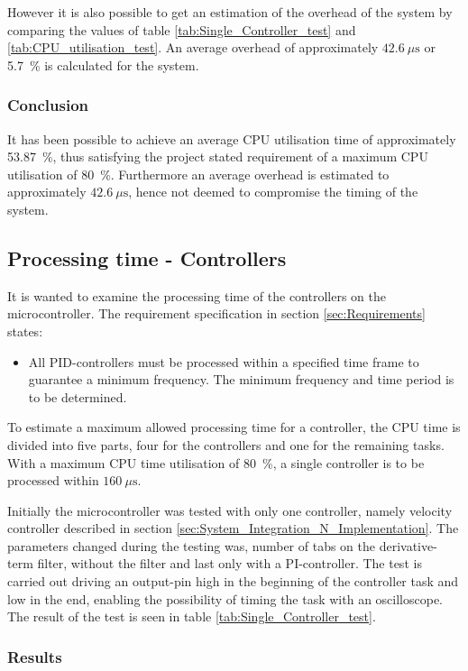 \documentclass[../../main.tex]{subfiles}
\begin{document}
However it is also possible to get an estimation of the overhead of the system by comparing the values of table \ref{tab:Single_Controller_test} and \ref{tab:CPU_utilisation_test}. An average overhead of approximately $\SI{42,6}{\mu\second}$ or \SI{5,7}{\percent} is calculated for the system.

\subsubsection*{Conclusion}
It has been possible to achieve an average CPU utilisation time of approximately \SI{ 53,87}{\percent}, thus satisfying the project stated requirement of a maximum CPU utilisation of \SI{80}{\percent}. Furthermore an average overhead is estimated to approximately $\SI{42,6}{\mu\second}$, hence not deemed to compromise the timing of the system.

\subsection{Processing time - Controllers}
It is wanted to examine the processing time of the controllers on the microcontroller. The requirement specification in section \ref{sec:Requirements} states:
\begin{itemize}
    \item All PID-controllers must be processed within a specified time frame to guarantee a minimum frequency. The minimum frequency and time period is to be determined.
\end{itemize}
To estimate a maximum allowed processing time for a controller, the CPU time is divided into five parts, four for the controllers and one for the remaining tasks. With a maximum CPU time utilisation of \SI{80}{\percent}, a single controller is to be processed within $\SI{160}{\mu\second}$.

Initially the microcontroller was tested with only one controller, namely velocity controller described in section \ref{sec:System_Integration_N_Implementation}. The parameters changed during the testing was, number of tabs on the derivative-term filter, without the filter and last only with a PI-controller. The test is carried out driving an output-pin high in the beginning of the controller task and low in the end, enabling the possibility of timing the task with an oscilloscope. The result of the test is seen in table \ref{tab:Single_Controller_test}.

\subsubsection*{Results}
\end{document}
